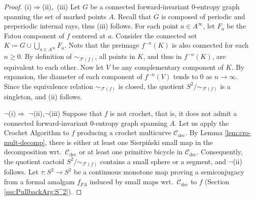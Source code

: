\documentclass{amsart}
\theoremstyle{plain}
\theoremstyle{definition}
\theoremstyle{remark}
\newcommand{\Fat}{{\mathcal F}}
\newcommand{\Jul}{{\mathcal J}}
\newcommand{\diam}{{\operatorname{diam}}}
\newcommand{\CC}{{\mathcal C}}
\newcommand{\NL}{{\mathfrak N}}
\newcommand{\cro}{{\operatorname{dec}}}
\begin{document}
\begin{proof}

(i)$\Rightarrow$(ii),\ (iii) Let $G$ be a connected forward-invariant $0$-entropy graph spanning the set of marked points $A$.  Recall that $G$ is composed of periodic and preperiodic internal rays, thus (iii) follows.  For each point $a\in A^\infty$, let $F_a$ be the Fatou component of $f$ centered at $a$.  %
Consider the connected set $K\coloneq G\cup \bigcup_{a\in A^\infty} F_a$.  
Note that the preimage $f^{-n}(K)$ is also connected for each $n\geq 0$. By definition of $\sim_{\Fat(f)}$,  all points in $K$, and thus in $f^{-n}(K)$,  are equivalent to each other.  Now let $V$ be any complementary component of $K$.  By expansion,  the diameter of each component of $f^{-n}(V)$ tends to $0$ as $n\to \infty$.  Since the equivalence relation $\sim_{\Fat(f)}$ is closed,  the quotient $S^2/\sim_{\Fat(f)}$ is a singleton, and (ii) follows. 



$\neg$(i)$\Rightarrow$ $\neg$(ii),$\neg$(iii) Suppose that $f$ is not crochet, that is, it does not admit a connected forward-invariant $0$-entropy graph spanning $A$.  Let us apply the Crochet Algorithm to $f$ producing a crochet multicurve $\CC_\cro$. By Lemma \ref{lem:cro-mult-decomp}, there is either at least one Sierpi\'{n}ski small map in the decomposition wrt.\ $\CC_\cro$ or at least one primitive bicycle in $\CC_\cro$. 
Consequently,  the quotient cactoid $S^2/\sim_{\Fat(f)}$ contains a small sphere or a segment,  and $\neg$(ii) follows.  %
Let $\tau\colon S^2\to S^2$ be a continuous monotone map proving a semiconjugacy from a formal amalgam $f_{FA}$ induced by small maps wrt.\  $\CC_\cro$ to $f$ (Section \ref{sss:PullbackArg:S^2}). 


\end{proof}
\end{document}
